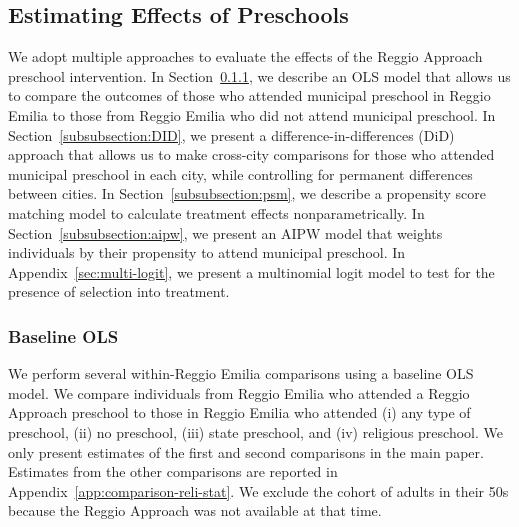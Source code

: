 

\subsection{Estimating Effects of Preschools}
We adopt multiple approaches to evaluate the effects of the Reggio Approach preschool intervention. In Section~\ref{subsubsection:OLS}, we describe an OLS model that allows us to compare the outcomes of those who attended municipal preschool in Reggio Emilia to those from Reggio Emilia who did not attend municipal preschool. In Section~\ref{subsubsection:DID}, we present a difference-in-differences (DiD) approach that allows us to make cross-city comparisons for those who attended  municipal preschool in each city, while controlling for permanent differences between cities. In Section~\ref{subsubsection:psm}, we describe a propensity score matching model to calculate treatment effects nonparametrically. In Section~\ref{subsubsection:aipw}, we present an AIPW model that weights individuals by their propensity to attend municipal preschool. In Appendix~\ref{sec:multi-logit}, we present a multinomial logit model to test for the presence of selection into treatment.

\subsubsection{Baseline OLS} \label{subsubsection:OLS}
We perform several within-Reggio Emilia comparisons using a baseline OLS model. We compare individuals from Reggio Emilia who attended a Reggio Approach preschool to those in Reggio Emilia who attended (i) any type of preschool, (ii) no preschool, (iii) state preschool, and (iv) religious preschool. We only present estimates of the first and second comparisons in the main paper. Estimates from the other comparisons are reported in Appendix~\ref{app:comparison-reli-stat}. We exclude the cohort of adults in their 50s because the Reggio Approach was not available at that time.

